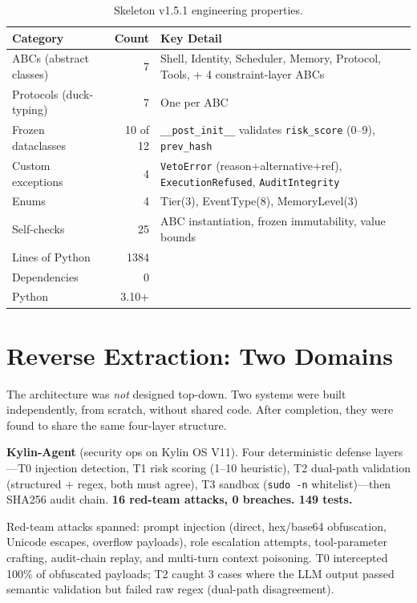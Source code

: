 \documentclass[letterpaper]{article} %
\begin{document}
\begin{table}[h]
\centering
\caption{Skeleton v1.5.1 engineering properties.}
\begin{tabular}{lrl}
\toprule
Category & Count & Key Detail \\
\midrule
ABCs (abstract classes) & 7 & Shell, Identity, Scheduler, Memory, Protocol, \newline Tools, + 4 constraint-layer ABCs \\
Protocols (duck-typing) & 7 & One per ABC \\
Frozen dataclasses & 10 of 12 & \verb|__post_init__| validates \verb|risk_score| (0--9), \verb|prev_hash| \\
Custom exceptions & 4 & \verb|VetoError| (reason+alternative+ref), \verb|ExecutionRefused|, \verb|AuditIntegrity| \\
Enums & 4 & Tier(3), EventType(8), MemoryLevel(3) \\
Self-checks & 25 & ABC instantiation, frozen immutability, value bounds \\
\addlinespace
Lines of Python & 1384 & \\
Dependencies & 0 & \\
Python & 3.10+ & \\
\bottomrule
\end{tabular}
\end{table}

\section{Reverse Extraction: Two Domains}

The architecture was \textit{not} designed top-down. Two systems were built
independently, from scratch, without shared code. After completion, they were
found to share the same four-layer structure.

\textbf{Kylin-Agent} (security ops on Kylin OS V11).  Four deterministic
defense layers---T0 injection detection, T1 risk scoring (1--10 heuristic),
T2 dual-path validation (structured + regex, both must agree), T3 sandbox
(\texttt{sudo -n} whitelist)---then SHA256 audit chain.  \textbf{16 red-team
attacks, 0 breaches.  149 tests.}

Red-team attacks spanned: prompt injection (direct, hex/base64 obfuscation,
Unicode escapes, overflow payloads), role escalation attempts, tool-parameter
crafting, audit-chain replay, and multi-turn context poisoning. T0 intercepted
100\% of obfuscated payloads; T2 caught 3 cases where the LLM output passed
semantic validation but failed raw regex (dual-path disagreement).
\end{document}
